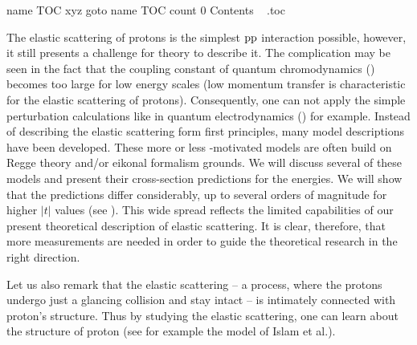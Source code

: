 \def\InsertToc{%
	\vfil\eject\forceoddpage\vskip3cm%
	\def\currentChapterName{Contents} \def\currentPartName{}%
	\pdfdest name {TOC} xyz
	\pdfoutline goto name {TOC} count 0 {\currentChapterName}%
	\hbox{%
		\vtop{%
			\noindent
			\fchapter Contents
		}%
	}%
	\bigskip\bigskip
	\jobname.toc
}


\InsertToc

\vfill\eject


\BeginText


The elastic scattering of protons is the simplest $\rm pp$ interaction possible, however, it still presents a challenge for theory to describe it. The complication may be seen in the fact that the coupling constant of quantum chromodynamics () becomes too large for low energy scales (low momentum transfer is characteristic for the elastic scattering of protons). Consequently, one can not apply the simple perturbation calculations like in quantum electrodynamics () for example. Instead of describing the elastic scattering form first principles, many model descriptions have been developed. These more or less -motivated models are often build on Regge theory and/or eikonal formalism grounds. We will discuss several of these models and present their  cross-section predictions for the  energies. We will show that the predictions differ considerably, up to several orders of magnitude for higher $|t|$ values (see ). This wide spread reflects the limited capabilities of our present theoretical description of elastic scattering. It is clear, therefore, that more measurements are needed in order to guide the theoretical research in the right direction.

Let us also remark that the elastic scattering -- a process, where the protons undergo just a glancing collision and stay intact -- is intimately connected with proton's structure. Thus by studying the elastic scattering, one can learn about the structure of proton (see for example the model of Islam et al.).


